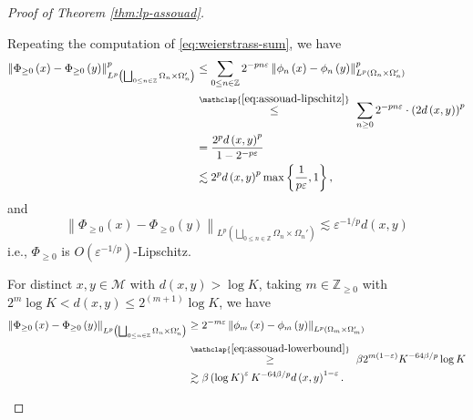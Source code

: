 \documentclass[11pt,reqno]{amsart}
\newcommand{\1}{\mathbf 1}
\begin{document}
\begin{proof}[Proof of Theorem \ref{thm:lp-assouad}]
\begin{enumerate}
Repeating the computation of \eqref{eq:weierstrass-sum}, we have
\begin{align*}
    \left\|\Phi_{\ge 0}\left(x\right)-\Phi_{\ge 0}\left(y\right)\right\|^p_{L^p\left(\bigsqcup_{0\le n\in \mathbb{Z}}\Omega_n\times \Omega_n'\right)}&\le \sum_{0\le n\in \mathbb{Z}}2^{-pn\varepsilon}\left\|\phi_n\left(x\right)-\phi_n\left(y\right)\right\|_{L^p\left(\Omega_n\times \Omega_n'\right)}^p\\
    &\stackrel{\mathclap{\eqref{eq:assouad-lipschitz}}}{\le}~ \sum_{n\ge 0}2^{-pn\varepsilon}\cdot \left(2d\left(x,y\right)\right)^p\\
    &=\frac{2^p d\left(x,y\right)^p }{1-2^{-p\varepsilon}}\\
    &\lesssim 2^{p} d\left(x,y\right)^{p}\max\left\{\frac{1}{p\varepsilon},1\right\},
\end{align*}
and
\[
\left\|\Phi_{\ge 0}\left(x\right)-\Phi_{\ge 0}\left(y\right)\right\|_{L^p\left(\bigsqcup_{0\le n\in \mathbb{Z}}\Omega_n\times \Omega_n'\right)}\lesssim  \varepsilon^{-1/p}d\left(x,y\right)
\]
i.e., $\Phi_{\ge 0}$ is $O\left(\varepsilon^{-1/p}\right)$-Lipschitz.

For distinct $x,y\in \mathcal{M}$ with $d\left(x,y\right)>\log K$, taking $ m\in \mathbb{Z}_{\ge 0}$ with $2^{m}\log K<d\left(x,y\right)\le 2^{\left(m+1\right)}\log K$, we have
\begin{align*}
    \left\|\Phi_{\ge 0}\left(x\right)-\Phi_{\ge 0}\left(y\right)\right\|_{L^p\left(\bigsqcup_{0\le n\in \mathbb{Z}}\Omega_n\times \Omega_n'\right)}&\ge 2^{-m\varepsilon}\left\|\phi_m\left(x\right)-\phi_m\left(y\right)\right\|_{L^p\left(\Omega_m\times\Omega_m'\right)}\\
    &\stackrel{\mathclap{\eqref{eq:assouad-lowerbound}}}{\ge}~\beta 2^{m\left(1-\varepsilon\right)}K^{-64\beta/p}\log K\\
    &\gtrsim \beta\left(\log K\right)^{\varepsilon}K^{-64\beta/p}d\left(x,y\right)^{1-\varepsilon}.
\end{align*}




\end{enumerate}
\end{proof}
\end{document}
